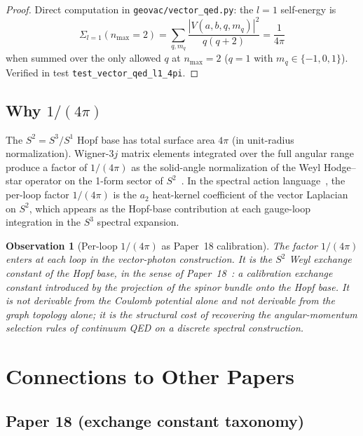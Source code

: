 \documentclass[11pt]{article}
\newtheorem{observation}{Observation}
\begin{document}
\begin{proof}
Direct computation in \texttt{geovac/vector\_qed.py}: the $l = 1$
self-energy is
\[
   \Sigma_{l=1}(n_{\max} = 2) = \sum_{q, m_q} \frac{|V(a, b, q, m_q)|^2}{q(q+2)}
   = \frac{1}{4\pi}
\]
when summed over the only allowed $q$ at $n_{\max} = 2$ ($q = 1$ with
$m_q \in \{-1, 0, 1\}$).  Verified in test
\texttt{test\_vector\_qed\_l1\_4pi}.
\end{proof}

\subsection{Why $1/(4\pi)$}

The $S^2 = S^3 / S^1$ Hopf base has total surface area $4\pi$ (in
unit-radius normalization).  Wigner-3$j$ matrix elements integrated
over the full angular range produce a factor of $1/(4\pi)$ as the
solid-angle normalization of the Weyl Hodge--star operator on the
1-form sector of $S^2$~\cite{paper25,jeffrey2010}.  In the spectral
action language~\cite{chamseddine_connes2010}, the per-loop factor
$1/(4\pi)$ is the $a_2$ heat-kernel coefficient of the vector
Laplacian on $S^2$, which appears as the Hopf-base contribution at
each gauge-loop integration in the $S^3$ spectral expansion.

\begin{observation}[Per-loop $1/(4\pi)$ as Paper~18 calibration]
\label{obs:paper18_calibration}
The factor $1/(4\pi)$ enters at each loop in the vector-photon
construction.  It is the $S^2$ Weyl exchange constant of the Hopf
base, in the sense of Paper~18~\cite{paper18}: a calibration exchange
constant introduced by the projection of the spinor bundle onto the
Hopf base.  It is not derivable from the Coulomb potential alone and
not derivable from the graph topology alone; it is the structural
cost of recovering the angular-momentum selection rules of continuum
QED on a discrete spectral construction.
\end{observation}

\section{Connections to Other Papers}
\label{sec:connections}

\subsection{Paper 18 (exchange constant taxonomy)}
\end{document}
